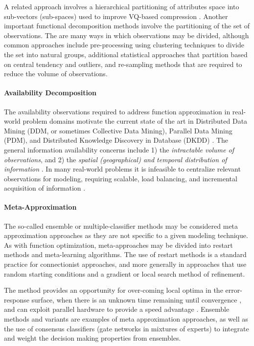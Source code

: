 A related approach involves a hierarchical partitioning of attributes space into sub-vectors (sub-spaces) used to improve VQ-based compression \cite{Gersho1984}. Another important functional decomposition methods involve the partitioning of the set of observations. The are many ways in which observations may be divided, although common approaches include pre-processing using clustering techniques to divide the set into natural groups, additional statistical approaches that partition based on central tendency and outliers, and re-sampling methods that are required to reduce the volume of observations.
	
\paragraph{Availability Decomposition}
The availability observations required to address function approximation in real-world problem domains motivate the current state of the art in Distributed Data Mining (DDM, or sometimes Collective Data Mining), Parallel Data Mining (PDM), and Distributed Knowledge Discovery in Database (DKDD) \cite{Kargupta2000}. The general information availability concerns include 1) the \emph{intractable volume of observations}, and 2) the \emph{spatial (geographical) and temporal distribution of information} \cite{Zaki1999}. In many real-world problems it is infeasible to centralize relevant observations for modeling, requiring scalable, load balancing, and incremental acquisition of information \cite{Skillicorn1999}. 
	
\paragraph{Meta-Approximation}
The so-called ensemble or multiple-classifier methods may be considered meta approximation approaches as they are not specific to a given modeling technique. As with function optimization, meta-approaches may be divided into restart methods and meta-learning algorithms. The use of restart methods is a standard practice for connectionist approaches, and more generally in approaches that use random starting conditions and a gradient or local search method of refinement. 

The method provides an opportunity for over-coming local optima in the error-response surface, when there is an unknown time remaining until convergence \cite{Magdon-ismail2000}, and can exploit parallel hardware to provide a speed advantage \cite{Blas2005}. Ensemble methods and variants are examples of meta approximation approaches, as well as the use of consensus classifiers (gate networks in mixtures of experts) to integrate and weight the decision making properties from ensembles. 

